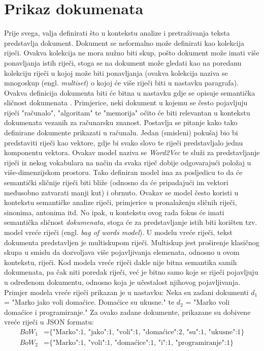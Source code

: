 \documentclass[times, utf8, zavrsni, numeric]{fer}
\begin{document}
\section{Prikaz dokumenata}
\label{subchap:docmodel_docview}
Prije svega, valja definirati što u kontekstu analize i pretraživanja teksta predstavlja dokument. Dokument se neformalno može definirati kao kolekcija riječi. Ovakva kolekcija ne mora nužno biti skup, pošto dokument može imati više ponavljanja istih riječi, stoga se na dokument može gledati kao na poredanu kolekciju riječi u kojoj može biti ponavljanja  (ovakva kolekcija naziva se mnogoskup (engl. \textit{multiset}) o kojoj će više riječi biti u nastavku paragrafa). Ovakva definicija dokumenta biti će bitna u nastavku gdje se opisuje semantička sličnost dokumenata \cite{Hausler2013}. Primjerice, neki dokument u kojemu se često pojavljuju riječi "računalo", "algoritam" te "memorija" očito će biti relevantan u kontekstu dokumenata vezanih za računarsku znanost. Postavlja se pitanje kako tako definirane dokumente prikazati u računalu. Jedan (smisleni) pokušaj bio bi predstaviti riječi kao vektore, gdje bi svako slovo te riječi predstavljalo jednu komponentu vektora. Ovakav model naziva se \textit{Word2Vec} te služi za predstavljanje riječi iz nekog vokabulara na način da svaka riječ dobije odgovarajući položaj u više-dimenzijskom prostoru. Tako definiran model ima za posljedicu to da će semantički sličnije riječi biti bliže (odnosno da će pripadajući im vektori međusobno zatvarati manji kut) i obrnuto. Ovakav se model često koristi u kontekstu semantičke analize riječi, primjerice u pronalaženju sličnih riječi, sinonima, antonima itd. No ipak, u kontekstu ovog rada fokus će imati semantička sličnost \textit{dokumenata}, stoga će za predstavljanje istih biti korišten tzv. model vreće riječi (engl. \textit{bag of words model}). U modelu vreće riječi, tekst dokumenta predstavljen je multiskupom riječi. Multiskup jest proširenje klasičnog skupa u smislu da dozvoljava više pojavljivanja elemenata, odnosno u ovom kontekstu, riječi. Kod modela vreće riječi dakle nije bitna semantika samih dokumenata, pa čak niti poredak riječi, već je bitno samo koje se riječi pojavljuju u određenom dokumentu, odnosno koja je učestalost njihovog pojavljivanja. Primjer modela vreće riječi prikazan je u nastavku:
Neka su zadani dokumenti $d_{1}$ = "Marko jako voli domaćice. Domaćice su ukusne." te $d_{2}$ = "Marko voli domaćice i programiranje." Za ovako zadane dokumente, prikazane su dobivene vreće riječi u JSON formatu:
\begin{align*}
BoW_{1} &= \text{\{"Marko":1, "jako":1, "voli":1, "domaćice":2, "su":1, "ukusne":1\}} \\
BoW_{2} &= \text{\{"Marko":1, "voli":1, "domaćice":1, "i":1, "programiranje":1\}}
\end{align*}
\end{document}

